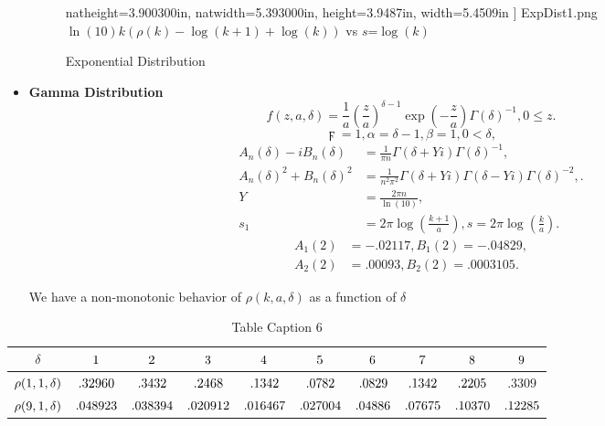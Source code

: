 \documentclass[titlepage,fleqn]{article}%
\begin{document}
\begin{itemize}
\begin{figure}[H]
{{\begin{center}
natheight=3.900300in,
natwidth=5.393000in,
height=3.9487in,
width=5.4509in
]%
{ExpDist1.png}%
\\
$\ln(10)k(\rho(k)-\log(k+1)+\log(k))$ vs $s$=$\log(k)$%
\end{center}}}
\caption{Exponential Distribution}\label{figureKey3}%
\end{figure}%


\item \textbf{Gamma Distribution}%
\[
f(z,a,\delta)=\frac{1}{a}\left(  \frac{z}{a}\right)  ^{\delta-1}\exp\left(
-\frac{z}{a}\right)  \Gamma\left(  \delta\right)  ^{-1},0\leq z.
\]%
\[
\digamma=1,\alpha=\delta-1,\beta=1,0<\delta,
\]%
\begin{align}
A_{n}(\delta)-iB_{n}(\delta)  &  =\frac{1}{\pi n}\Gamma\left(  \delta
+Yi\right)  \Gamma\left(  \delta\right)  ^{-1},\\
A_{n}(\delta)^{2}+B_{n}(\delta)^{2}  &  =\frac{1}{n^{2}\pi^{2}}\Gamma\left(
\delta+Yi\right)  \Gamma\left(  \delta-Yi\right)  \Gamma\left(  \delta\right)
^{-2},.\\
Y  &  =\frac{2\pi n}{\ln(10)},\\
s_{1}  &  =2\pi\log\left(  \frac{k+1}{a}\right)  ,s=2\pi\log\left(  \frac
{k}{a}\right)  .
\end{align}%
\begin{align}
A_{1}(2)  &  =-.02117,B_{1}(2)=-.04829,\\
A_{2}(2)  &  =.00093,B_{2}(2)=.0003105.
\end{align}


We have a non-monotonic behavior of $\rho(k,a,\delta)$ as a function of
$\delta$
\end{itemize}

%

\begin{table}[!htbp] \centering
\begin{tabular}
[c]{|c|c|c|c|c|c|c|c|c|c|}\hline\hline
$\delta$ & ${\small 1}$ & ${\small 2}$ & ${\small 3}$ & ${\small 4}$ &
${\small 5}$ & ${\small 6}$ & ${\small 7}$ & ${\small 8}$ & ${\small 9}%
$\\\hline
${\small \rho(1,1,\delta)}$ & ${\small .32960}$ & ${\small .3432}$ &
${\small .2468}$ & ${\small .1342}$ & ${\small .0782}$ & ${\small .0829}$ &
${\small .1342}$ & ${\small .2205}$ & {\small .}$3309$\\\hline
${\small \rho(9,1,\delta)}$ & ${\small .048923}$ & ${\small .038394}$ &
${\small .020912}$ & ${\small .016467}$ & ${\small .027004}$ &
${\small .04886}$ & ${\small .07675}$ & ${\small .10370}$ & ${\small .12285}%
$\\\hline\hline
\end{tabular}
\caption{Table Caption 6}\label{TableKey6}%
\end{table}%
\end{document}
